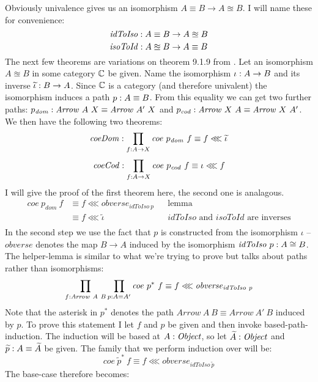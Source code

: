 Obviously univalence gives us an isomorphism $A \equiv B \to A \approxeq B$. I
will name these for convenience:
%
$$
\mathit{idToIso} \mathrel{:} A \equiv B \to A \approxeq B
$$
%
$$
\mathit{isoToId} \mathrel{:} A \approxeq B \to A \equiv B
$$
%
The next few theorems are variations on theorem 9.1.9 from \cite{hott-2013}. Let
an isomorphism $A \approxeq B$ in some category $\mathbb{C}$ be given. Name the
isomorphism $\iota \mathrel{:} A \to B$ and its inverse $\widetilde{\iota} \mathrel{:} B \to A$.
Since $\mathbb{C}$ is a category (and therefore univalent) the isomorphism induces a
path $p \mathrel{:} A \equiv B$. From this equality we can get two further paths:
$p_{\mathit{dom}} \mathrel{:} \mathit{Arrow}\ A\ X \equiv \mathit{Arrow}\ A'\ X$ and
$p_{\mathit{cod}} \mathrel{:} \mathit{Arrow}\ X\ A \equiv \mathit{Arrow}\ X\ A'$. We
then have the following two theorems:
%
$$
\mathit{coeDom} \mathrel{:} \prod_{f \mathrel{:} A \to X} \mathit{coe}\ p_{\mathit{dom}}\ f \equiv f \lll \widetilde{\iota}
$$
%
%
\begin{align}
\label{eq:coeCod}
\mathit{coeCod} \tp \prod_{f \tp A \to X} \mathit{coe}\ p_{\mathit{cod}}\ f \equiv \iota \lll f
\end{align}
%
I will give the proof of the first theorem here, the second one is analagous.
\begin{align*}
\mathit{coe}\ p_{\mathit{dom}}\ f
  & \equiv f \lll \mathit{obverse}_{\mathit{idToIso}\ p} && \text{lemma} \\
  & \equiv f \lll \widetilde{\iota}
    && \text{$\mathit{idToIso}$ and $\mathit{isoToId}$ are inverses}\\
\end{align*}
%
In the second step we use the fact that $p$ is constructed from the isomorphism
$\iota$ -- $\mathit{obverse}$ denotes the map $B \to A$ induced by the
isomorphism $\mathit{idToIso}\ p \tp A \cong B$. The helper-lemma is similar to
what we're trying to prove but talks about paths rather than isomorphisms:
%
$$
\prod_{f \mathrel{:} \mathit{Arrow}\ A\ B} \prod_{p \mathrel{:} A \equiv A'} \mathit{coe}\ p^*\ f \equiv f \lll \mathit{obverse}_{\mathit{idToIso}\ p}
$$
%
Note that the asterisk in $p^*$ denotes the path $\mathit{Arrow}\ A\ B \equiv
\mathit{Arrow}\ A'\ B$ induced by $p$. To prove this statement I let $f$ and $p$
be given and then invoke based-path-induction. The induction will be based at $A
\mathrel{:} \mathit{Object}$, so let $\widetilde{A} \mathrel{:} \mathit{Object}$ and $\widetilde{p} \mathrel{:}
A \equiv \widetilde{A}$ be given. The family that we perform induction over will
be:
%
$$
\mathit{coe}\ {\widetilde{p}}^*\ f \equiv f \lll \mathit{obverse}_{\mathit{idToIso}\ \widetilde{p}}
$$
The base-case therefore becomes:
